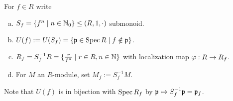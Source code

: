 \documentclass[a4paper]{report}
\begin{document}
\begin{defi}
  For $f \in R$ write
  \begin{enumerate}[(a)]
    \item $S_{f} = \{f^{n} \mid n \in \mathbb{N}_0\} \le (R, 1, \cdot)$ submonoid.
    \item $U(f) := U(S_{f}) = \{\mathfrak p \in \operatorname{Spec} R \mid f \notin \mathfrak p\}$.
    \item $R_{f} = S_{f}^{-1}R = \{\frac r{f^{n}} \mid r \in R, n \in \mathbb{N}\}$ with localization map $\varphi: R \to R_{f}$.
    \item For $M$ an $R$-module, set $M_{f} := S_{f}^{-1}M$.
  \end{enumerate}
  Note that $U(f)$ is in bijection with $\operatorname{Spec} R_{f}$ by $\mathfrak p \mapsto S_{f}^{-1}\mathfrak p = \mathfrak p_{f}$.

\end{defi}
\end{document}
